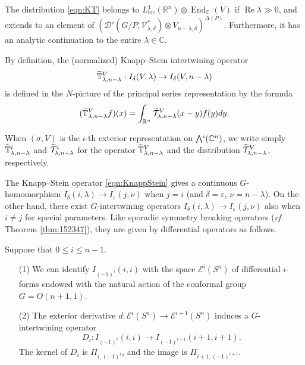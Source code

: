 \begin{lemma}
\label{lem:nKS}
The distribution \eqref{eqn:KT} belongs
 to $L_{\operatorname{loc}}^1({\mathbb{R}}^n) \otimes {\operatorname{End}}_{\mathbb{C}}(V)$
 if $\operatorname{Re} \lambda \gg 0$, 
 and extends to an element of 
 $({\mathcal{D}}'(G/P, {\mathcal{V}}_{\lambda,\delta}^{\ast}) \otimes V_{n-\lambda, \delta})^{\Delta(P)}$.  
Furthermore,
 it has an analytic continuation
 to the entire $\lambda \in {\mathbb{C}}$.  
\end{lemma}
By definition, 
 the (normalized) 
Knapp--Stein intertwining operator
\begin{equation}
\label{eqn:KnappStein}
  \widetilde{{\mathbb{T}}}_{{\lambda},{n-\lambda}}^{{V}}
  :
  I_{\delta}(V,\lambda) \to I_{\delta}(V,n-\lambda) 
\end{equation}
is defined 
 in the $N$-picture
 of the principal series representation 
 by the formula
\[
(\widetilde{{\mathbb{T}}}_{{\lambda},{n-\lambda}}^{{V}} f)(x)
 = \int_{{\mathbb{R}}^n} \widetilde{\mathcal{T}}_{{\lambda},{n-\lambda}}^{{V}} (x-y) f(y) dy.  
\]



When $(\sigma,V)$ is the $i$-th exterior representation
 on $\Exterior^i({\mathbb{C}}^n)$,
 we write simply 
 $\widetilde{{\mathbb{T}}}_{{\lambda},{n-\lambda}}^{{i}}$ and $\widetilde{\mathcal{T}}_{{\lambda},{n-\lambda}}^{{i}}$
 for 
 the operator $\widetilde{{\mathbb{T}}}_{{\lambda},{n-\lambda}}^{{V}}$
 and the distribution $\widetilde{\mathcal{T}}_{{\lambda},{n-\lambda}}^{{V}}$, 
respectively.  



The Knapp--Stein operator \eqref{eqn:KnappStein} gives
 a continuous $G$-homomorphism 
 $I_{\delta}(i,\lambda) \to I_{\varepsilon}(j,\nu)$
  when $j=i$ 
 (and $\delta =\varepsilon$, $\nu=n-\lambda$).  
On the other hand,
 there exist $G$-intertwining operators
 $I_{\delta}(i,\lambda) \to I_{\varepsilon}(j,\nu)$
 also when $i \ne j$
 for special parameters.  
Like sporadic symmetry breaking operators
 ({\it{cf}}. Theorem \ref{thm:152347}),
 they are given by differential operators
 as follows.  
\begin{fact}
\label{fact:Di}
Suppose that $0 \le i \le n-1$.  
\begin{enumerate}
\item[{\rm{(1)}}]
We can identify $I_{(-1)^i}(i,i)$
 with the space ${\mathcal{E}}^i(S^n)$
 of differential $i$-forms
 endowed with the natural action of the conformal group 
 $G=O(n+1,1)$. 
\item[{\rm{(2)}}]
The exterior derivative
 $d \colon {\mathcal{E}}^i(S^n) \to {\mathcal{E}}^{i+1}(S^n)$
 induces a $G$-intertwining operator
\[
   D_i \colon I_{(-1)^i}(i,i) \rightarrow I_{(-1)^{i+1}}(i+1,i+1).  
\]
The kernel of $D_i$ is $\Pi_{i,(-1)^{i}}$, 
 and the image is $\Pi_{i+1,(-1)^{i+1}}$. 
\end{enumerate}
\end{fact}


